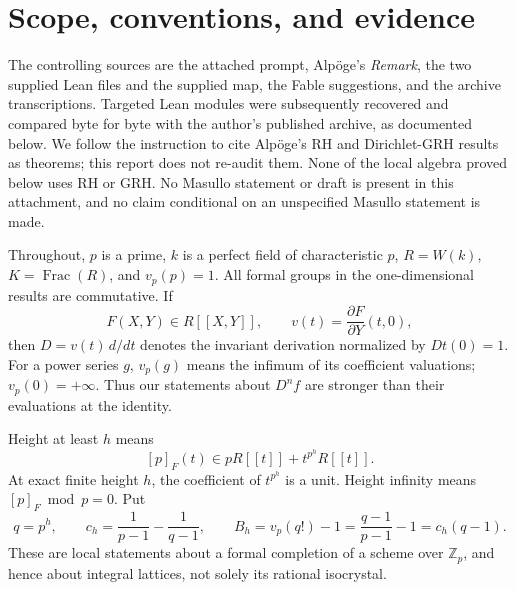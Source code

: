 \documentclass[11pt,a4paper]{article}
\theoremstyle{definition}\newtheorem{remark}[theorem]{Remark}
\newcommand{\Z}{\mathbb Z}\newcommand{\Q}{\mathbb Q}\newcommand{\F}{\mathbb F}
\newcommand{\vp}{v_p}\newcommand{\dR}{\mathrm{dR}}\newcommand{\crys}{\mathrm{crys}}
\begin{document}
\begin{abstract}
\textbf{Status.} The local bounds and the stated algebraic corrections are proved and checked. The literal height-only substitution into the existing logarithm and alternating CM-type interfaces is refuted. A different construction producing a shorter global theta-lift chain remains open at an explicit construction-and-cost gate. That broader part remains under active investigation; no shorter proof is claimed. The final state will be set only when the stopping rule or completion ends the session.
\end{abstract}
\tableofcontents
\newpage

\section{Scope, conventions, and evidence}

The controlling sources are the attached prompt, Alp\"oge's \emph{Remark}, the two supplied Lean files and the supplied map, the Fable suggestions, and the archive transcriptions. Targeted Lean modules were subsequently recovered and compared byte for byte with the author's published archive, as documented below. We follow the instruction to cite Alp\"oge's RH and Dirichlet-GRH results as theorems; this report does not re-audit them. None of the local algebra proved below uses RH or GRH. No Masullo statement or draft is present in this attachment, and no claim conditional on an unspecified Masullo statement is made.

Throughout, $p$ is a prime, $k$ is a perfect field of characteristic $p$, $R=W(k)$, $K=\operatorname{Frac}(R)$, and $\vp(p)=1$. All formal groups in the one-dimensional results are commutative. If
\[
 F(X,Y)\in R[[X,Y]],\qquad v(t)=\frac{\partial F}{\partial Y}(t,0),
\]
then $D=v(t)\,d/dt$ denotes the invariant derivation normalized by $Dt(0)=1$. For a power series $g$, $\vp(g)$ means the infimum of its coefficient valuations; $\vp(0)=+\infty$. Thus our statements about $D^n f$ are stronger than their evaluations at the identity.

Height at least $h$ means
\begin{equation}\label{eq:height}
 [p]_F(t)\in pR[[t]]+t^{p^h}R[[t]].
\end{equation}
At exact finite height $h$, the coefficient of $t^{p^h}$ is a unit. Height infinity means $[p]_F\bmod p=0$. Put
\begin{equation}\label{eq:constants}
 q=p^h,\qquad c_h=\frac1{p-1}-\frac1{q-1},\qquad
 B_h=\vp(q!)-1=\frac{q-1}{p-1}-1=c_h(q-1).
\end{equation}
These are local statements about a formal completion of a scheme over $\Z_p$, and hence about integral lattices, not solely its rational isocrystal.
\end{document}
